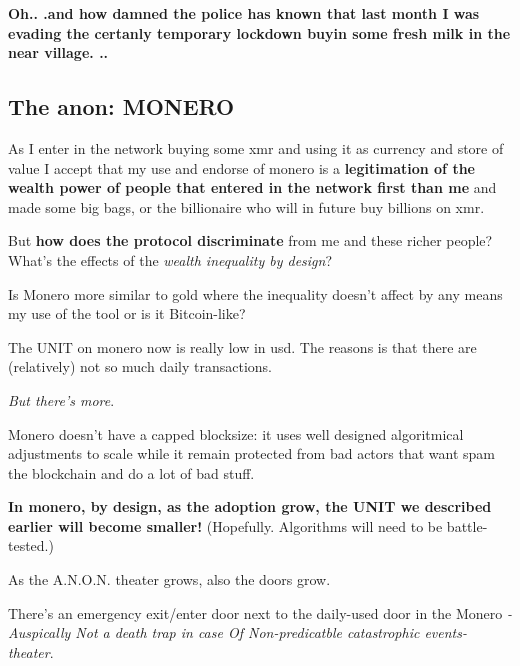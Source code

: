 \documentclass{article}
\begin{document}
\textbf{Oh.. .and how damned the police has known that last month I was evading the certanly temporary lockdown buyin some fresh milk in the near village. ..}\vspace{0.5cm}




\subsection{The anon: MONERO}


As I enter in the network buying some xmr and using it as currency and store of value I accept that my use and endorse of monero is a \textbf{legitimation of the wealth power of people that entered in the network first than me} and made some big bags, or the billionaire who will in future buy billions on xmr.\vspace{0.2cm}


But \textbf{how does the protocol discriminate} from me and these richer people? What's the effects of the \emph{wealth inequality by design}?\vspace{0.2cm}



Is Monero more similar to gold where the inequality doesn't affect by any means my use of the tool or is it Bitcoin-like?\vspace{0.2cm}


The UNIT on monero now is really low in usd. The reasons is that there are (relatively) not so much daily transactions.\vspace{0.3cm}


\emph{But there's more}.\vspace{0.3cm}

Monero doesn't have a capped blocksize: it uses well designed algoritmical adjustments to scale while it remain protected from bad actors that want spam the blockchain and do a lot of bad stuff.

\textbf{In monero, by design, as the adoption grow, the UNIT we described earlier will become smaller!} (Hopefully. Algorithms will need to be battle-tested.)\vspace{0.3cm}



As the A.N.O.N. theater grows, also the doors grow.\vspace{0.2cm}


There's an emergency exit/enter door next to the daily-used door in the Monero \emph{-Auspically Not a death trap in case Of Non-predicatble catastrophic events- theater}. \vspace{0.2cm}
\end{document}
